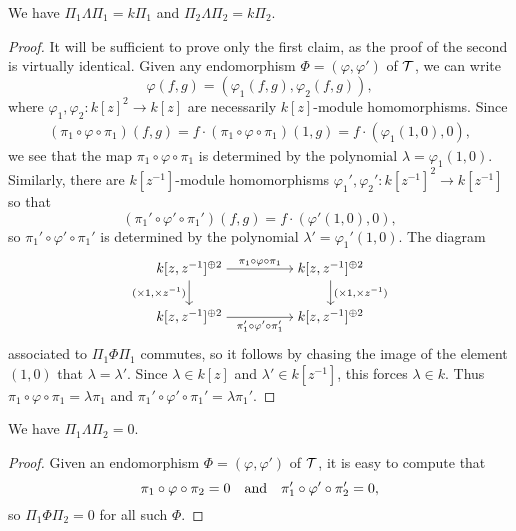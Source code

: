 \begin{lemma}
  \label{lemma_eAe_peirce_decomp_tilting_algebra}
  We have $\Pi_1 \Lambda \Pi_1 = k \Pi_1$ and $\Pi_2 \Lambda \Pi_2 = k\Pi_2$.
\end{lemma}

\begin{proof}
  It will be sufficient to prove only the first claim, as the proof
  of the second is virtually identical.
  Given any endomorphism $\Phi = (\varphi, \varphi')$ of $\mathcal{T}$, we can write
  \[
    \varphi(f, g) = (\varphi_1(f, g), \varphi_2(f, g)),
  \]
  where $\varphi_1, \varphi_2: k[z]^2 \to k[z]$ are necessarily
  $k[z]$-module homomorphisms.
  Since
  \begin{align*}
    (\pi_1 \circ \varphi \circ \pi_1)(f, g)
    = f \cdot (\pi_1 \circ \varphi \circ \pi_1)(1, g)
    = f \cdot (\varphi_1(1, 0), 0),
  \end{align*}
  we see that the map $\pi_1 \circ \varphi \circ \pi_1$ is determined
  by the polynomial $\lambda = \varphi_1(1, 0)$.
  Similarly, there are $k[z^{-1}]$-module homomorphisms $\varphi_1',
  \varphi_2': k[z^{-1}]^2 \to k[z^{-1}]$ so that
  \[
    (\pi_1' \circ \varphi' \circ \pi_1')(f, g) = f \cdot (\varphi'(1, 0), 0),
  \]
  so $\pi_1' \circ \varphi' \circ \pi_1'$ is determined by the
  polynomial $\lambda' = \varphi_1'(1, 0)$.
  The diagram
  \[
    \begin{tikzcd}[cramped]
      {k[z, z^{-1}]^{\biprod 2}} && {k[z, z^{-1}]^{\biprod 2}} \\
      {k[z, z^{-1}]^{\biprod 2}} && {k[z, z^{-1}]^{\biprod 2}}
      \arrow["{\pi_1 \circ \varphi \circ \pi_1}", from=1-1, to=1-3]
      \arrow["{(\times 1, \times z^{-1})}"', from=1-1, to=2-1]
      \arrow["{(\times 1, \times z^{-1})}", from=1-3, to=2-3]
      \arrow["{\pi_1' \circ \varphi' \circ \pi_1'}"', from=2-1, to=2-3]
    \end{tikzcd}
  \]
  associated to $\Pi_1 \Phi \Pi_1$ commutes, so it follows by chasing
  the image of the element $(1, 0)$ that $\lambda = \lambda'$.
  Since $\lambda \in k[z]$ and $\lambda' \in k[z^{-1}]$, this forces
  $\lambda \in k$.
  Thus $\pi_1 \circ \varphi \circ \pi_1 = \lambda \pi_1$ and $\pi_1'
  \circ \varphi' \circ \pi_1' = \lambda \pi_1'$.
\end{proof}

\begin{lemma}
  We have $\Pi_1 \Lambda \Pi_2 = 0$.
\end{lemma}

\begin{proof}
  Given an endomorphism $\Phi = (\varphi, \varphi')$ of $\mathcal{T}$, it
  is easy to compute that
  \[
    \pi_1 \circ \varphi \circ \pi_2 = 0
    \quad \text{and} \quad
    \pi_1' \circ \varphi' \circ \pi_2' = 0,
  \]
  so $\Pi_1 \Phi \Pi_2 = 0$ for all such $\Phi$.
\end{proof}

